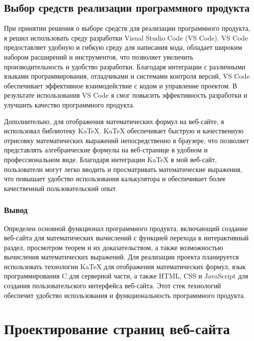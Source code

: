\documentclass{article}
\begin{document}
    
    \subsection{Выбор средств реализации программного продукта}

    При принятии решения о выборе средств для реализации программного продукта, я решил использовать среду разработки Visual Studio Code (VS Code). VS Code предоставляет удобную и гибкую среду для написания кода, обладает широким набором расширений и инструментов, что позволяет увеличить производительность и удобство разработки. Благодаря интеграции с различными языками программирования, отладчиками и системами контроля версий, VS Code обеспечивает эффективное взаимодействие с кодом и управление проектом. В результате использования VS Code я смог повысить эффективность разработки и улучшить качество программного продукта.

    Дополнительно, для отображения математических формул на веб-сайте, я использовал библиотеку KaTeX. KaTeX обеспечивает быструю и качественную отрисовку математических выражений непосредственно в браузере, что позволяет представлять алгебраические формулы на веб-странице в удобном и профессиональном виде. Благодаря интеграции KaTeX в мой веб-сайт, пользователи могут легко вводить и просматривать математические выражения, что повышает удобство использования калькулятора и обеспечивает более качественный пользовательский опыт.

    \subsubsection{Вывод}

    Определен основной функционал программного продукта, включающий создание веб-сайта для математических вычислений с функцией перехода в интерактивный раздел, просмотром теорем и их доказательством, а также возможностью вычисления математических выражений. Для реализации проекта планируется использовать технологии KaTeX для отображения математических формул, язык программирования C для серверной части, а также HTML, CSS и JavaScript для создания пользовательского интерфейса веб-сайта. Этот стек технологий обеспечит удобство использования и функциональность программного продукта.
    




    
    \section{Проектирование страниц веб-сайта}
\end{document}
